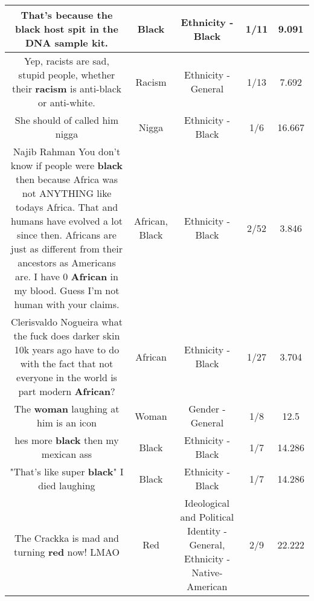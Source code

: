 \documentclass[11pt]{article}
\newlength\mylength
\begin{document}
\begin{center}
\begin{longtable}{|C{.65\mylength}|C{.30\mylength}|C{.12\mylength}|C{.12\mylength}|C{.12\mylength}|}
  \small That's because the \textbf{black} host spit in the DNA sample kit.\normalsize   & Black & Ethnicity - Black & 1/11 & 9.091 \\  \hline
  \small Yep, racists are sad, stupid people, whether their \textbf{racism} is anti-black or anti-white.\normalsize   & Racism & Ethnicity - General & 1/13 & 7.692 \\  \hline
  \small She should of called him nigga\normalsize   & Nigga & Ethnicity - Black & 1/6 & 16.667 \\  \hline
  \small Najib Rahman You don't know if people were \textbf{black} then because Africa was not ANYTHING like todays Africa. That and humans have evolved a lot since then.  Africans are just as different from their ancestors as Americans are. I have 0 \textbf{African} in my blood. Guess I'm not human with your claims.\normalsize   & African, Black & Ethnicity - Black & 2/52 & 3.846 \\  \hline
  \small Clerisvaldo Nogueira what the fuck does darker skin 10k years ago have to do with the fact that not everyone in the world is part modern \textbf{African}?\normalsize   & African & Ethnicity - Black & 1/27 & 3.704 \\  \hline
  \small The \textbf{woman} laughing at him is an icon\normalsize   & Woman & Gender - General & 1/8 & 12.5 \\  \hline
  \small hes more \textbf{black} then my mexican ass\normalsize   & Black & Ethnicity - Black & 1/7 & 14.286 \\  \hline
  \small "That's like super \textbf{black}" I died laughing\normalsize   & Black & Ethnicity - Black & 1/7 & 14.286 \\  \hline
  \small The Crackka is mad and turning \textbf{r\textbf{ed}} now! LMAO\normalsize   & Red &  Ideological and Political Identity - General, Ethnicity - Native-American & 2/9 & 22.222 \\  \hline

\end{longtable}
\end{center}
\end{document}
